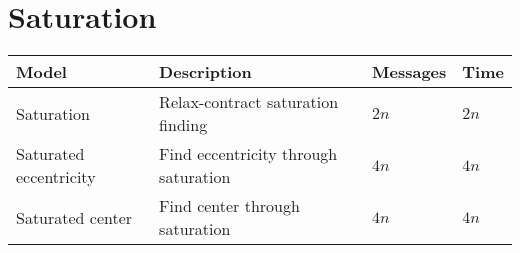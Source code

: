 \section{Saturation}
\begin{table}[h]
\begin{tabular}{llll}
			\textbf{Model}			& \textbf{Description}						& \textbf{Messages}						& \textbf{Time} \\
	\hline 	Saturation				& Relax-contract saturation finding			& $2n$					 				& $2n$ \\
	\hline 	Saturated eccentricity	& Find eccentricity through saturation		& $4n$									& $4n$ \\
	\hline 	Saturated center		& Find center through saturation			& $4n$									& $4n$ \\
\end{tabular}
\end{table}
